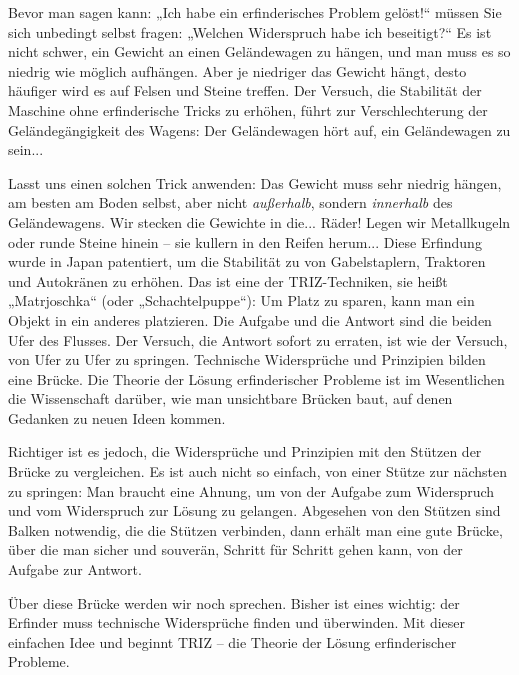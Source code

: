 \documentclass[11pt,a4paper]{article}
\begin{document}
Bevor man sagen kann: „Ich habe ein erfinderisches Problem gelöst!“ müssen Sie
sich unbedingt selbst fragen: „Welchen Widerspruch habe ich beseitigt?“ Es ist
nicht schwer, ein Gewicht an einen Geländewagen zu hängen, und man muss es so
niedrig wie möglich aufhängen.  Aber je niedriger das Gewicht hängt, desto
häufiger wird es auf Felsen und Steine treffen. Der Versuch, die Stabilität
der Maschine ohne erfinderische Tricks zu erhöhen, führt zur Verschlechterung
der Geländegängigkeit des Wagens: Der Geländewagen hört auf, ein Geländewagen
zu sein...

Lasst uns einen solchen Trick anwenden: Das Gewicht muss sehr niedrig hängen,
am besten am Boden selbst, aber nicht \emph{außerhalb}, sondern
\emph{innerhalb} des Geländewagens. Wir stecken die Gewichte in die... Räder!
Legen wir Metallkugeln oder runde Steine hinein -- sie kullern in den Reifen
herum...  Diese Erfindung wurde in Japan patentiert, um die Stabilität zu von
Gabelstaplern, Traktoren und Autokränen zu erhöhen.  Das ist eine der
TRIZ-Techniken, sie heißt „Matrjoschka“ (oder „Schachtelpuppe“): Um Platz zu
sparen, kann man ein Objekt in ein anderes platzieren.  Die Aufgabe und die
Antwort sind die beiden Ufer des Flusses.  Der Versuch, die Antwort sofort zu
erraten, ist wie der Versuch, von Ufer zu Ufer zu springen. Technische
Widersprüche und Prinzipien bilden eine Brücke. Die Theorie der Lösung
erfinderischer Probleme ist im Wesentlichen die Wissenschaft darüber, wie man
unsichtbare Brücken baut, auf denen Gedanken zu neuen Ideen kommen.

Richtiger ist es jedoch, die Widersprüche und Prinzipien mit den Stützen der
Brücke zu vergleichen.  Es ist auch nicht so einfach, von einer Stütze zur
nächsten zu springen: Man braucht eine Ahnung, um von der Aufgabe zum
Widerspruch und vom Widerspruch zur Lösung zu gelangen. Abgesehen von den
Stützen sind Balken notwendig, die die Stützen verbinden, dann erhält man eine
gute Brücke, über die man sicher und souverän, Schritt für Schritt gehen kann,
von der Aufgabe zur Antwort.

Über diese Brücke werden wir noch sprechen.  Bisher ist eines wichtig: der
Erfinder muss technische Widersprüche finden und überwinden. Mit dieser
einfachen Idee und beginnt TRIZ -- die Theorie der Lösung erfinderischer
Probleme.
\enlargethispage{1em}
\end{document}
